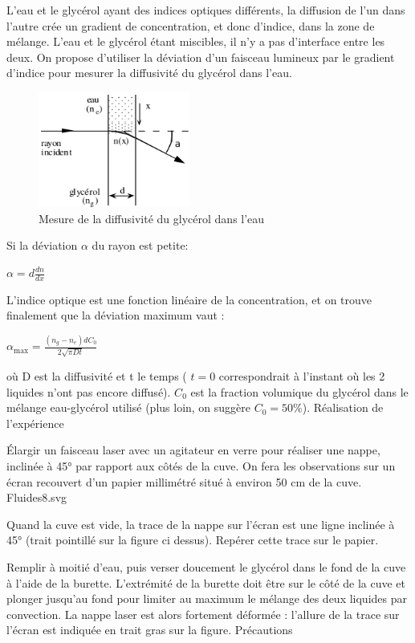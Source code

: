\documentclass{article}%
\begin{document}
L'eau et le glycérol ayant des indices optiques différents, la diffusion de l'un dans l'autre crée un gradient de concentration, et donc d'indice, dans la zone de mélange. L'eau et le glycérol étant miscibles, il n'y a pas d'interface entre les deux. On propose d'utiliser la déviation d'un faisceau lumineux par le gradient d'indice pour mesurer la diffusivité du glycérol dans l'eau.
\begin{figure}
	\centerline{\includegraphics[width=5cm]{images-exp/Fluides7.png}}
	\caption{Mesure de la diffusivité du glycérol dans l'eau}
\end{figure}

Si la déviation $\alpha$ du rayon est petite:

$ \alpha = d\frac{dn}{dx}$

L'indice optique est une fonction linéaire de la concentration, et on trouve finalement que la déviation maximum vaut :

$\alpha_\textrm{max} = \frac{(n_g-n_e)d C_0}{2\sqrt{\pi D t}}$

où D est la diffusivité et t le temps ( $t=0$ correspondrait à l'instant où les 2 liquides n'ont pas encore diffusé). $C_0$ est la fraction volumique du glycérol dans le mélange eau-glycérol utilisé (plus loin, on suggère $C_0= 50 \%$).
Réalisation de l'expérience

Élargir un faisceau laser avec un agitateur en verre pour réaliser une nappe, inclinée à 45° par rapport aux côtés de la cuve. On fera les observations sur un écran recouvert d'un papier millimétré situé à environ 50 cm de la cuve.
Fluides8.svg

Quand la cuve est vide, la trace de la nappe sur l'écran est une ligne inclinée à 45° (trait pointillé sur la figure ci dessus). Repérer cette trace sur le papier.

Remplir à moitié d'eau, puis verser doucement le glycérol dans le fond de la cuve à l'aide de la burette. L'extrémité de la burette doit être sur le côté de la cuve et plonger jusqu'au fond pour limiter au maximum le mélange des deux liquides par convection. La nappe laser est alors fortement déformée : l'allure de la trace sur l'écran est indiquée en trait gras sur la figure.
Précautions
\end{document}

